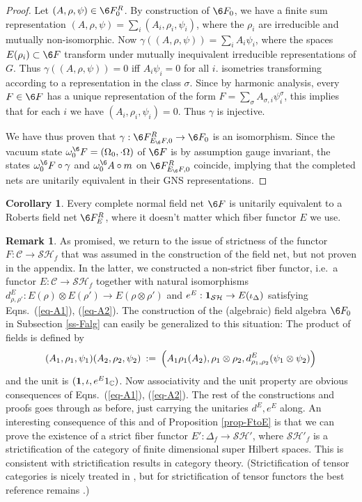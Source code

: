 \documentclass[12pt]{article}
\theoremstyle{definition}
\newtheorem{cor}[thm]{Corollary}
\theoremstyle{definition}
\newtheorem{note}[thm]{Remark}
\theoremstyle{remark}
\def\2#1{{\mathcal #1}}
\def\7#1{{\mathbb #1}}
\def\1#1{{\bf #1}}
\newcommand{\rarr}{\rightarrow}
\begin{document}
\begin{proof}
Let $(A,\rho,\psi)\in\6F^R_0$. By construction of $\6F_0$, we have a finite sum representation
$(A,\rho,\psi)=\sum_i(A_i,\rho_i,\psi_i)$, where the $\rho_i$ are irreducible and mutually
non-isomorphic. Now $\gamma((A,\rho,\psi))=\sum_i A_i\psi_i$, where the spaces
$E(\rho_i)\subset\6F$ transform under mutually inequivalent irreducible representations of $G$.
Thus $\gamma((A,\rho,\psi))=0$ iff $A_i\psi_i=0$ for all $i$. 
isometries transforming according to a representation in the class $\sigma$.
Since by harmonic analysis, every $F\in\6F$ has a unique representation of the form 
$F=\sum_\sigma A_{\sigma,i}\psi^\sigma_i$, this implies that for each $i$ we have
$(A_i,\rho_i,\psi_i)=0$. Thus $\gamma$ is injective.

We have thus proven that $\gamma:\6F^R_{E_\6F,0}\rarr\6F_0$ is an isomorphism. Since the vacuum state
$\omega_0^\6F=(\Omega_0,\cdot\Omega)$ of $\6F$ is by assumption gauge invariant, the states
$\omega_0^\6F\circ \gamma$ and $\omega_0^\6A\circ m$ on $\6F^R_{E_\6F,0}$ coincide, implying that
the completed nets are unitarily equivalent in their GNS representations.
\end{proof}

\begin{cor}
Every complete normal field net $\6F$ is unitarily equivalent to a Roberts field net $\6F^R_E$,
where it doesn't matter which fiber functor $E$ we use. 
\end{cor}

\begin{note}
As promised, we return to the issue of strictness of the functor $F:\2C\rarr\2S\2H_f$ that was
assumed in the construction of the field net, but not proven in the appendix. In the latter, we
constructed a non-strict fiber functor, i.e.\ a functor $E:\2C\rarr\2S\2H_f$ together with natural
isomorphisms $d^E_{\rho,\rho'}: E(\rho)\otimes E(\rho')\rarr E(\rho\otimes\rho')$ and
$e^E:\11_{\2S\2H}\rarr E(\iota_\Delta)$ satisfying Eqns.\ (\ref{eq-A1}), (\ref{eq-A2}).
The construction of the (algebraic) field algebra $\6F_0$ in Subsection \ref{ss-Falg} can easily be
generalized to this situation: The product of fields is defined by
\[ (A_1,\rho _1,\psi _1)(A_2,\rho _2,\psi _2)\: := \: \Bigl(
A_1\rho_1(A_2),\rho _1\otimes \rho _2, d^E_{\rho_1,\rho_2}(\psi
_1\otimes \psi _2) \Bigr) \] and the unit is
$(\11,\iota,e^E1_\7C)$. Now associativity and the unit property are
obvious consequences of Eqns.\ (\ref{eq-A1}), (\ref{eq-A2}). The rest
of the constructions and proofs goes through as before, just carrying
the unitaries $d^E, e^E$ along. An interesting consequence of this and
of Proposition \ref{prop-FtoE} is that we can prove the existence of a
strict fiber functor $E':\Delta_f\rarr\2S\2H'$, where $\2S\2H'_f$ is a
strictification of the category of finite dimensional super Hilbert
spaces. This is consistent with strictification results in category
theory. (Strictification of tensor categories is nicely treated in
\cite[Chap.\ XI]{kas}, but for strictification of tensor functors the
best reference remains \cite[Sect.\ 1]{stjo}.)
\end{note}
\end{document}
